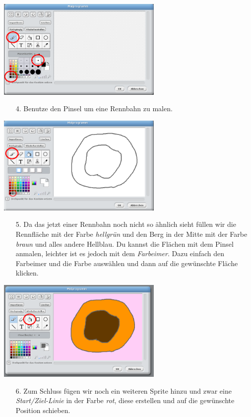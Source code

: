 \includegraphics[width=0.6\textwidth]{images/aufgabe4_rennbahn_pinsel_waehlen.png}
\begin{itemize}
\item[4. ] Benutze den Pinsel um eine Rennbahn zu malen.
\end{itemize}
\includegraphics[width=0.6\textwidth]{images/aufgabe4_rennbahn_malen_00.png}
\begin{itemize}
\item[5. ] Da das jetzt einer Rennbahn noch nicht so ähnlich sieht füllen wir die Rennfläche mit der Farbe \emph{hellgrün} und den Berg in der Mitte mit der Farbe \emph{braun} und alles andere Hellblau. Du kannst die Flächen mit dem Pinsel anmalen, leichter ist es jedoch mit dem \emph{Farbeimer}. Dazu einfach den Farbeimer und die Farbe auswählen und dann auf die gewünschte Fläche klicken.
\end{itemize}
\includegraphics[width=0.6\textwidth]{images/aufgabe4_rennbahn_malen_01.png}
\begin{itemize}
\item[6. ] Zum Schluss fügen wir noch ein weiteren Sprite hinzu und zwar eine \emph{Start/Ziel-Linie} in der Farbe \emph{rot}, diese erstellen und auf die gewünschte Position schieben.
\end{itemize}
